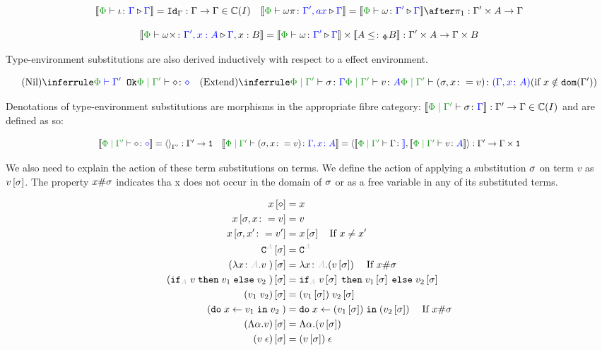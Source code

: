 \documentclass{Report}
\begin{document}
\[
    \deno{\pewrel{\i}{\G}{\G}} = \idg: \G \rightarrow \G \in \C(I)
    \quad
    \deno{\pewrel{\w\pi}{\G', ax}{\G}} = \deno{\pewrel{\w}{\G'}{\G}}\after\p: \G'\times A \rightarrow \G
\]

\[
    \deno{\pewrel{\w\x}{\G', x: A}{\G, x: B}} = \deno{\pewrel{\w}{\G'}{\G}}\times \deno{A\subtypep B}: \G'\times A \rightarrow \G\times B
\]

Type-environment substitutions are also derived inductively with respect to a effect environment.


\[
    \ntreeruleI{Nil}{\wellformedok{\P}{\G'}}{\etyperelation{\P}{\G'}{\nil}{\nil}}
    \quad
    \condtreeruleII{Extend}{
        \etyperelation{\P}{\G'}{\si}{\G}
    }{
        \etyperelation{\P}{\G'}{v}{A}
    }{
        \etyperelation{\P}{\G'}{(\si, x \setto v)}{(\gax)}
    }{x \notin \dom{\G'}}
\]

Denotations of type-environment substitutions are morphisms in the appropriate fibre category: $\deno{\etyperelation{\P}{\G'}{\si}{\G}}: \G' \rightarrow \G \in \C(I)$ and are defined as so:

\[
    \scalebox{0.9}{$
    \deno{\etyperelation{\P}{\G'}{\nil}{\nil}} = \term{\G'}: \G' \rightarrow \1
    \quad
    \deno{\etyperelation{\P}{\G'}{(\si, x \setto v)}{\gax}} = \pr{\deno{\etyperelation{\P}{\G'}{\G}}}{\deno{\etyperelation{\P}{\G'}{v}{A}}}: \G' \rightarrow \G\times \1
    $}
\]

We also need to explain the action of these term substitutions on terms. We define the action of applying a substitution $\sigma$  on term $v$ as $v\left[\sigma\right]$. The property $x\#\sigma$ indicates tha x does not occur in the domain of $\sigma$ or as a free variable in any of its substituted terms.

\begin{align*}
    x\sub{\nil} & = x \\
    x\sub{\si,x\setto v} & = v \\
    x\sub{\si,x'\setto v'} & = x\ssi\qt{If }x \neq x'\\
    \const{A}\ssi & = \const{A} \\
    (\lam{x}{A}{v})\ssi &= \lam{x}{A}{(v\ssi)}\qt{If }x\#\si\\
    (\pifthenelse{A}{v}{v_1}{v_2})\ssi &= \pifthenelse{A}{v\ssi}{v_1\ssi}{v_2\ssi}\\
    (\apply{v_1}{v_2})\ssi&= \apply{(v_1\ssi)}{v_2\ssi}\\
    (\doin{x}{v_1}{v_2})&= \doin{x}{(v_1\ssi)}{(v_2\ssi)}\qt{If } x\#\si\\
    (\elam{\a}{v})\ssi & = \elam{\a}{(v\ssi)}\\
    (\eapp{v}{\e})\ssi & = \eapp{(v\ssi)}{\e}\\
\end{align*}
\end{document}
